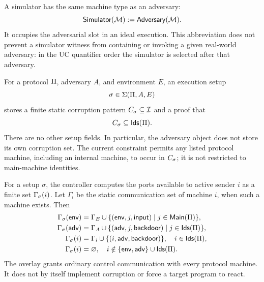 \begin{definition}[Simulator]
\label{def:uc-simulator}
\leanok
A simulator has the same machine type as an adversary:
\[
  \mathsf{Simulator}(\mathcal{M}):=\mathsf{Adversary}(\mathcal{M}).
\]
It occupies the adversarial slot in an ideal execution.  This abbreviation does
not prevent a simulator witness from containing or invoking a given real-world
adversary: in the UC quantifier order the simulator is selected after that
adversary.
\end{definition}

\begin{definition}
\label{def:uc-execution-setup}
\leanok
For a protocol \(\Pi\), adversary \(A\), and environment \(E\), an execution
setup
\[
  \sigma\in\Sigma(\Pi,A,E)
\]
stores a finite static corruption pattern \(C_\sigma\subseteq\mathcal{I}\) and a
proof that
\[
  C_\sigma\subseteq\mathsf{Ids}(\Pi).
\]
There are no other setup fields.  In particular, the adversary object does not
store its own corruption set.  The current constraint permits any listed
protocol machine, including an internal machine, to occur in \(C_\sigma\);
it is not restricted to main-machine identities. 
\end{definition}

\begin{definition}
\label{def:uc-runtime-overlay}
\leanok
For a setup \(\sigma\), the controller computes the ports available to active
sender \(i\) as a finite set \(\Gamma_\sigma(i)\).  Let \(\Gamma_i\) be the
static communication set of machine \(i\), when such a machine exists.  Then
\[
\begin{aligned}
  \Gamma_\sigma(\mathsf{env})
  ={}&\Gamma_E\cup
    \{(\mathsf{env},j,\mathsf{input})\mid j\in\mathsf{Main}(\Pi)\},\\
  \Gamma_\sigma(\mathsf{adv})
  ={}&\Gamma_A\cup
    \{(\mathsf{adv},j,\mathsf{backdoor})\mid j\in\mathsf{Ids}(\Pi)\},\\
  \Gamma_\sigma(i)
  ={}&\Gamma_i\cup\{(i,\mathsf{adv},\mathsf{backdoor})\},
    \quad i\in\mathsf{Ids}(\Pi),\\
  \Gamma_\sigma(i)
  ={}&\varnothing,
    \quad i\notin\{\mathsf{env},\mathsf{adv}\}\cup\mathsf{Ids}(\Pi).
\end{aligned}
\]
The overlay grants ordinary control communication with every protocol machine.
It does not by itself implement corruption or force a target program to react.
\end{definition}

